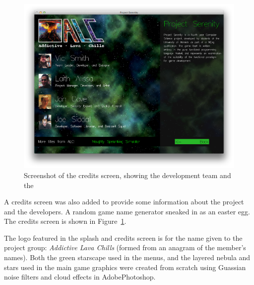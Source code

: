 \begin{figure}[t]
	\hspace{-2.5em}\includegraphics[width=17cm]{res/serenityscreens/05-credits}
	\caption[Screenshot of the credits screen]{Screenshot of the credits screen, showing the development team and the }
	\label{fig:credits}
\end{figure}

A credits screen was also added to provide some information about the project and the developers. A random game name generator sneaked in as an easter egg. The credits screen is shown in Figure~\ref{fig:credits}.

The logo featured in the splash and credits screen is for the name given to the project group: \emph{Addictive Lava Chills} (formed from an anagram of the member's names). 
Both the green starscape used in the menus, and the layered nebula and stars used in the main game graphics were created from scratch using Guassian noise filters and cloud effects in Adobe\textregistered Photoshop.
